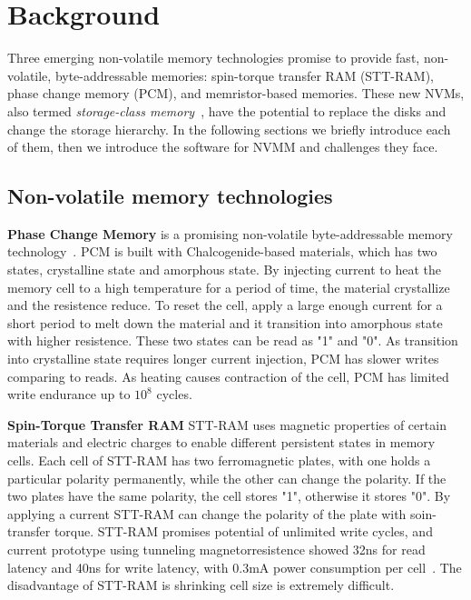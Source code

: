 \section{Background}
\label{sec:background}

Three emerging non-volatile memory technologies promise to provide fast,
 non-volatile, byte-addressable memories: spin-torque transfer RAM (STT-RAM),
phase change memory (PCM), and memristor-based memories. These new NVMs, also
termed \emph{storage-class memory}~\cite{scm}, have the potential to replace
the disks and change the storage hierarchy. In the following
sections we briefly introduce each of them, then we introduce the software
for NVMM and challenges they face.

\subsection{Non-volatile memory technologies}
\label{sec:hardware}

\textbf{Phase Change Memory} is a promising non-volatile byte-addressable
memory technology~\cite{PCM_EfficientMainMemory, PCMHierarchy}.
PCM is built with Chalcogenide-based materials, which has
two states, crystalline state and amorphous state. By
injecting current to heat the memory cell to a high temperature for a period
of time, the material crystallize and the resistence reduce. To reset the cell,
apply a large enough current for a short period to melt down the
material and it transition into amorphous state with higher resistence.
 These two states can be read as "1" and "0". As transition into crystalline
state requires longer current injection, PCM has slower writes comparing to
reads.  
As heating causes contraction of the cell, PCM has limited write endurance
up to $10^8$ cycles.
 
\textbf{Spin-Torque Transfer RAM} STT-RAM uses magnetic properties of 
certain materials and electric charges to enable different persistent states 
in memory cells. Each cell of STT-RAM has two ferromagnetic plates, with
one holds a particular polarity permanently, while the other can change the
polarity. If the two plates have the same polarity, the cell stores "1",
otherwise it stores "0". By applying a current STT-RAM can change the polarity
of the plate with soin-transfer torque.
STT-RAM promises potential of unlimited write cycles, and
current prototype using tunneling magnetorresistence showed 32ns for
read latency and 40ns for write latency, with 0.3mA power consumption
per cell~\cite{sttram}. The disadvantage of STT-RAM is shrinking cell size is
extremely difficult.

